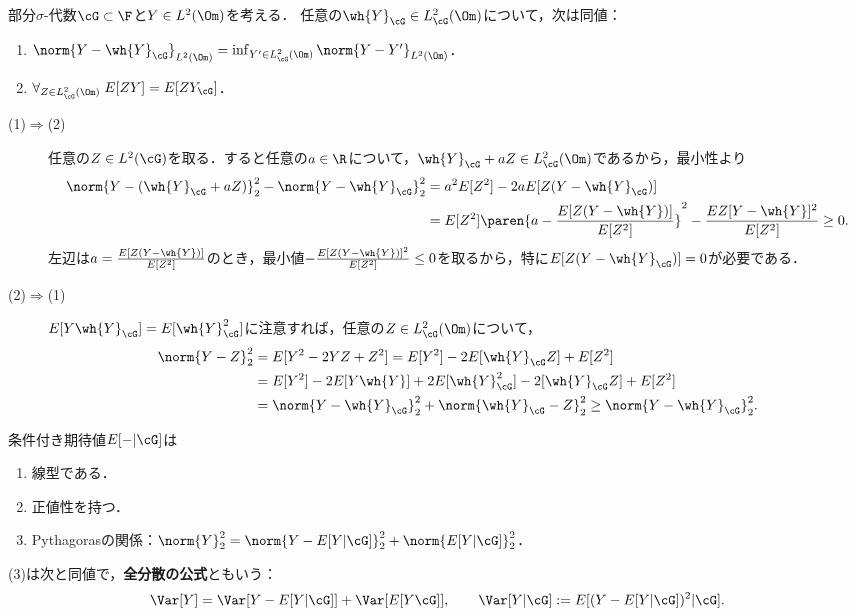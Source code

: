 \documentclass[uplatex,dvipdfmx]{jsreport}
\begin{document}
\begin{theorem}[条件付き期待値の射影としての特徴付け]
    部分$\sigma$-代数$\cG\subset\F$と$Y\in L^2(\Om)$を考える．
    任意の$\wh{Y}_\cG\in L^2_\cG(\Om)$について，次は同値：
    \begin{enumerate}
        \item $\norm{Y-\wh{Y}_\cG}_{L^2(\Om)}=\inf_{Y'\in L^2_\cG(\Om)}\norm{Y-Y'}_{L^2(\Om)}$．
        \item $\forall_{Z\in L^2_\cG(\Om)}\;E[ZY]=E[ZY_\cG]$．
    \end{enumerate}
\end{theorem}
\begin{Proof}\mbox{}
    \begin{description}
        \item[(1)$\Rightarrow$(2)] 任意の$Z\in L^2(\cG)$を取る．すると任意の$a\in\R$について，$\wh{Y}_\cG+aZ\in L^2_\cG(\Om)$であるから，最小性より
        \begin{align*}
            \norm{Y-(\wh{Y}_\cG+aZ)}_2^2-\norm{Y-\wh{Y}_\cG}_2^2&=a^2E[Z^2]-2aE[Z(Y-\wh{Y}_\cG)]\\
            &=E[Z^2]\paren{a-\frac{E[Z(Y-\wh{Y})]}{E[Z^2]}}^2-\frac{EZ[Y-\wh{Y}]^2}{E[Z^2]}\ge0.
        \end{align*}
        左辺は$a=\frac{E[Z(Y-\wh{Y})]}{E[Z^2]}$のとき，最小値$-\frac{E[Z(Y-\wh{Y})]^2}{E[Z^2]}\le0$を取るから，特に$E[Z(Y-\wh{Y}_\cG)]=0$が必要である．
        \item[(2)$\Rightarrow$(1)] $E[Y\wh{Y}_\cG]=E[\wh{Y}_\cG^2]$に注意すれば，任意の$Z\in L^2_\cG(\Om)$について，
        \begin{align*}
            \norm{Y-Z}_2^2&=E[Y^2-2YZ+Z^2]=E[Y^2]-2E[\wh{Y}_\cG Z]+E[Z^2]\\
            &=E[Y^2]-2E[Y\wh{Y}]+2E[\wh{Y}_\cG^2]-2[\wh{Y}_\cG Z]+E[Z^2]\\
            &=\norm{Y-\wh{Y}_\cG}_2^2+\norm{\wh{Y}_\cG-Z}_2^2\ge\norm{Y-\wh{Y}_\cG}^2_2.
        \end{align*}
    \end{description}
\end{Proof}

\begin{corollary}
    条件付き期待値$E[-|\cG]$は
    \begin{enumerate}
        \item 線型である．
        \item 正値性を持つ．
        \item Pythagorasの関係：$\norm{Y}^2_2=\norm{Y-E[Y|\cG]}^2_2+\norm{E[Y|\cG]}^2_2$．
    \end{enumerate}
    (3)は次と同値で，\textbf{全分散の公式}ともいう：
    \[\Var[Y]=\Var[Y-E[Y|\cG]]+\Var[E[Y\cG]],\qquad\Var[Y|\cG]:=E[(Y-E[Y|\cG])^2|\cG].\]
\end{corollary}
\end{document}
